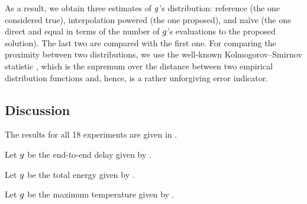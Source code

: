 As a result, we obtain three estimates of $g$'s distribution: reference (the
one considered true), interpolation powered (the one proposed), and na\"{i}ve
(the one direct and equal in terms of the number of $g$'s evaluations to the
proposed solution). The last two are compared with the first one. For comparing
the proximity between two distributions, we use the well-known
Kolmogorov--Smirnov statistic \cite{rao2009}, which is the supremum over the
distance between two empirical distribution functions and, hence, is a rather
unforgiving error indicator.


\subsection{Discussion}
The results for all 18 experiments are given in .

Let $g$ be the end-to-end delay given by .

Let $g$ be the total energy given by .

Let $g$ be the maximum temperature given by .
